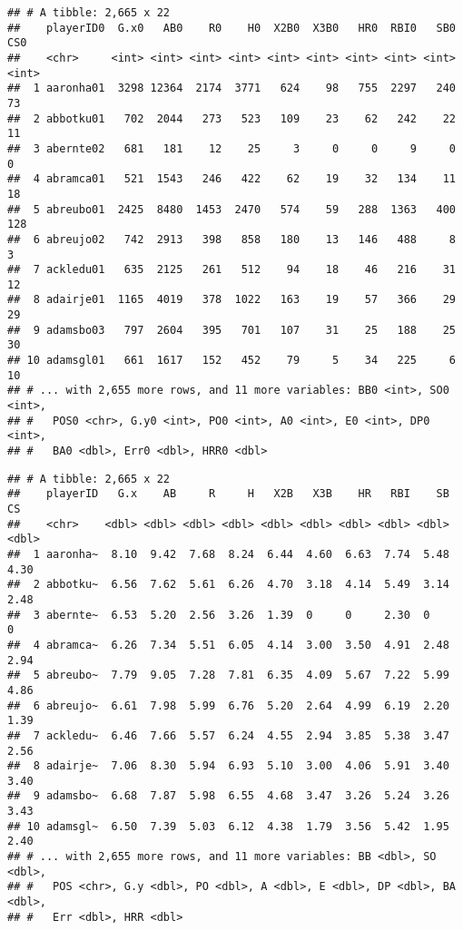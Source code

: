 \documentclass[]{book}
\newenvironment{Shaded}{\begin{snugshade}}{\end{snugshade}}
\newcommand{\KeywordTok}[1]{\textcolor[rgb]{0.13,0.29,0.53}{\textbf{#1}}}
\newcommand{\DecValTok}[1]{\textcolor[rgb]{0.00,0.00,0.81}{#1}}
\newcommand{\StringTok}[1]{\textcolor[rgb]{0.31,0.60,0.02}{#1}}
\newcommand{\CommentTok}[1]{\textcolor[rgb]{0.56,0.35,0.01}{\textit{#1}}}
\newcommand{\ControlFlowTok}[1]{\textcolor[rgb]{0.13,0.29,0.53}{\textbf{#1}}}
\newcommand{\OperatorTok}[1]{\textcolor[rgb]{0.81,0.36,0.00}{\textbf{#1}}}
\newcommand{\NormalTok}[1]{#1}
\begin{document}
\begin{verbatim}
## # A tibble: 2,665 x 22
##    playerID0  G.x0   AB0    R0    H0  X2B0  X3B0   HR0  RBI0   SB0   CS0
##    <chr>     <int> <int> <int> <int> <int> <int> <int> <int> <int> <int>
##  1 aaronha01  3298 12364  2174  3771   624    98   755  2297   240    73
##  2 abbotku01   702  2044   273   523   109    23    62   242    22    11
##  3 abernte02   681   181    12    25     3     0     0     9     0     0
##  4 abramca01   521  1543   246   422    62    19    32   134    11    18
##  5 abreubo01  2425  8480  1453  2470   574    59   288  1363   400   128
##  6 abreujo02   742  2913   398   858   180    13   146   488     8     3
##  7 ackledu01   635  2125   261   512    94    18    46   216    31    12
##  8 adairje01  1165  4019   378  1022   163    19    57   366    29    29
##  9 adamsbo03   797  2604   395   701   107    31    25   188    25    30
## 10 adamsgl01   661  1617   152   452    79     5    34   225     6    10
## # ... with 2,655 more rows, and 11 more variables: BB0 <int>, SO0 <int>,
## #   POS0 <chr>, G.y0 <int>, PO0 <int>, A0 <int>, E0 <int>, DP0 <int>,
## #   BA0 <dbl>, Err0 <dbl>, HRR0 <dbl>
\end{verbatim}

\begin{Shaded}
\end{Shaded}

\begin{verbatim}
## # A tibble: 2,665 x 22
##    playerID   G.x    AB     R     H   X2B   X3B    HR   RBI    SB    CS
##    <chr>    <dbl> <dbl> <dbl> <dbl> <dbl> <dbl> <dbl> <dbl> <dbl> <dbl>
##  1 aaronha~  8.10  9.42  7.68  8.24  6.44  4.60  6.63  7.74  5.48  4.30
##  2 abbotku~  6.56  7.62  5.61  6.26  4.70  3.18  4.14  5.49  3.14  2.48
##  3 abernte~  6.53  5.20  2.56  3.26  1.39  0     0     2.30  0     0   
##  4 abramca~  6.26  7.34  5.51  6.05  4.14  3.00  3.50  4.91  2.48  2.94
##  5 abreubo~  7.79  9.05  7.28  7.81  6.35  4.09  5.67  7.22  5.99  4.86
##  6 abreujo~  6.61  7.98  5.99  6.76  5.20  2.64  4.99  6.19  2.20  1.39
##  7 ackledu~  6.46  7.66  5.57  6.24  4.55  2.94  3.85  5.38  3.47  2.56
##  8 adairje~  7.06  8.30  5.94  6.93  5.10  3.00  4.06  5.91  3.40  3.40
##  9 adamsbo~  6.68  7.87  5.98  6.55  4.68  3.47  3.26  5.24  3.26  3.43
## 10 adamsgl~  6.50  7.39  5.03  6.12  4.38  1.79  3.56  5.42  1.95  2.40
## # ... with 2,655 more rows, and 11 more variables: BB <dbl>, SO <dbl>,
## #   POS <chr>, G.y <dbl>, PO <dbl>, A <dbl>, E <dbl>, DP <dbl>, BA <dbl>,
## #   Err <dbl>, HRR <dbl>
\end{verbatim}
\end{document}
